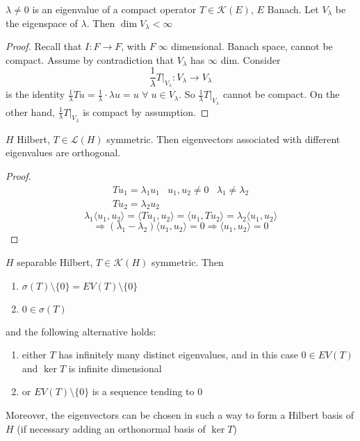 \begin{proposition}
    \(\lambda \neq 0\) is an eigenvalue of a compact operator \(T \in \mathcal{K}(E)\), \(E \) Banach. Let \(V_\lambda\) be the eigenspace of \(\lambda\). Then \(\dim V_\lambda < \infty\)
\end{proposition}
\begin{proof}
    Recall that \(I: F \to F \), with \(F  \; \infty\) dimensional. Banach space, cannot be compact. Assume by contradiction that \(V_\lambda\) has \(\infty\) dim. Consider
    \[
        \frac{1}{\lambda} T |_{V_\lambda}: V_\lambda \to V_\lambda 
    \]
    is the identity \(\frac{1}{\lambda} T u = \frac{1}{\lambda} \cdot \lambda u = u\) \(\forall\; u \in V_\lambda\). 
    So \(\frac{1}{\lambda} T |_{V_\lambda}\) cannot be compact. On the other hand, \(\frac{1}{\lambda} T |_{V_\lambda}\) is compact by assumption.
\end{proof}

\begin{proposition}
    \(H\) Hilbert, \(T \in \mathcal{L}(H)\) symmetric. Then eigenvectors associated with different eigenvalues are orthogonal. 
\end{proposition}
\begin{proof}
    \[
        \begin{array}{ccc}
            Tu_1 = \lambda_1 u_1 & u_1, u_2 \neq 0 & \lambda_1 \neq \lambda_2 \\
            Tu_2 = \lambda_2 u_2 
        \end{array}
    \]
    \[
        \lambda_1 \langle u_1, u_2 \rangle = \langle Tu_1, u_2\rangle = \langle u_1, T u_2\rangle = \lambda_2 \langle u_1, u_2\rangle
    \]
    \[
        \Rightarrow (\lambda_1 - \lambda_2) \langle u_1, u_2\rangle = 0 \Rightarrow \langle u_1, u_2\rangle = 0
    \]
\end{proof}

\begin{theorem}
    \(H\) separable Hilbert, \(T \in \mathcal{K}(H)\) symmetric. Then
    \begin{enumerate}
        \item \(\sigma(T) \setminus \{0\} = EV (T) \setminus \{0\}\)
        \item \(0 \in \sigma(T)\)
    \end{enumerate}
    and the following alternative holds:
    \begin{enumerate}
        \item either \(T\) has infinitely many distinct eigenvalues, and in this case \(0 \in EV(T)\) and \(\ker T\) is infinite dimensional
        \item or \(EV(T) \setminus \{0\} \) is a sequence tending to \(0\)
    \end{enumerate}
    Moreover, the eigenvectors can be chosen in such a way to form a Hilbert basis of \(H\) (if necessary adding an orthonormal basis of \(\ker T\))
\end{theorem}

